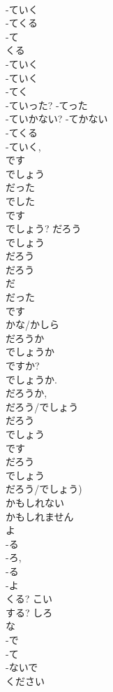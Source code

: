 \documentclass[8pt]{extreport}
\begin{document}
\begin{CJK}{UTF8}{min}
\\	-ていく 
\\	-てくる 
\\	-て 
\\	くる	
\\	-ていく	
\\	-ていく 
\\	-てく	
\\	-ていった?	-てった	
\\	-ていかない?	-てかない	
\\	-てくる 
\\	-ていく, 
\\	です 
\\	でしょう 
\\	だった 
\\	でした	
\\	です 
\\	でしょう?	だろう	
\\	でしょう 
\\	だろう 
\\	だろう 
\\	だ 
\\	だった	
\\	です 
\\	かな/かしら 
\\	だろうか 
\\	でしょうか	
\\	ですか?	
\\	でしょうか. 
\\	だろうか, 
\\	だろう/でしょう 
\\	だろう 
\\	でしょう 
\\	です 
\\	だろう 
\\	でしょう	
\\	だろう/でしょう)
\\	かもしれない 
\\	かもしれません 
\\	よ	
\\	-る 
\\	-ろ, 
\\	-る 
\\	-よ	
\\	くる?	こい	
\\	する?	しろ	
\\	な 
\\	-で 
\\	-て 
\\	-ないで 
\\	ください 

\end{CJK}
\end{document}
